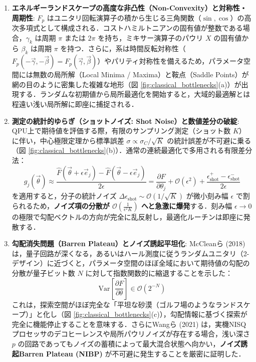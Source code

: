 \documentclass[11pt,a4paper,oneside,openany]{ltjsbook}
\theoremstyle{definition}
\theoremstyle{plain}
\theoremstyle{remark}
\begin{document}
\begin{enumerate}
    \item \textbf{エネルギーランドスケープの高度な非凸性（Non-Convexity）と対称性・周期性}:
          $F_p$ はユニタリ回転演算子の積から生じる三角関数（$\sin, \cos$）の高次多項式として構成される．コストハミルトニアンの固有値が整数である場合，$\gamma_k$ は周期 $\pi$ または $2\pi$ を持ち，ミキサー演算子のパウリ $X$ の固有値から $\beta_k$ は周期 $\pi$ を持つ．さらに，系は時間反転対称性（$F_p(-\vec{\gamma}, -\vec{\beta}) = F_p(\vec{\gamma}, \vec{\beta})$）やパリティ対称性を備えるため，パラメータ空間には無数の局所解（Local Minima / Maxima）と鞍点（Saddle Points）が網の目のように密集した複雑な地形（図 \ref{fig:classical_bottlenecks}(a)）が出現する．ランダムな初期値から局所最適化を開始すると，大域的最適解とは程遠い浅い局所解に即座に捕捉される．
          
    \item \textbf{測定の統計的ゆらぎ（ショットノイズ: Shot Noise）と数値差分の破綻}:
          QPU上で期待値を評価する際，有限のサンプリング測定（ショット数 $K$）に伴い，中心極限定理から標準誤差 $\sigma \propto \sigma_C / \sqrt{K}$ の統計誤差が不可避に乗る（図 \ref{fig:classical_bottlenecks}(b)）．通常の連続最適化で多用される有限差分法：
          \begin{equation}
              g_j(\vec{\theta}) \approx \frac{\hat{F}(\vec{\theta} + \epsilon \vec{e}_j) - \hat{F}(\vec{\theta} - \epsilon \vec{e}_j)}{2\epsilon} = \frac{\partial F}{\partial \theta_j} + \mathcal{O}(\epsilon^2) + \frac{\epsilon_{\text{shot}}^+ - \epsilon_{\text{shot}}^-}{2\epsilon}
          \end{equation}
          を適用すると，分子の統計ノイズ $\Delta \epsilon_{\text{shot}} \sim \mathcal{O}(1/\sqrt{K})$ が微小刻み幅 $\epsilon$ で割られるため，\textbf{ノイズ項の分散が $\mathcal{O}\left(\frac{1}{\epsilon^2 K}\right)$ へと急激に爆発}する．刻み幅 $\epsilon \to 0$ の極限で勾配ベクトルの方向が完全に乱反射し，最適化ルーチンは即座に発散する．
          
    \item \textbf{勾配消失問題（Barren Plateau）とノイズ誘起平坦化}:
          McCleanら (2018)\cite{mcclean2018barren} は，量子回路が深くなる，あるいはハール測度に従うランダムユニタリ（2-デザイン）に近づくと，パラメータ空間のほぼ全域において期待値の勾配の分散が量子ビット数 $N$ に対して指数関数的に縮退することを示した：
          \begin{equation}
              \text{Var}\left[ \frac{\partial F}{\partial \theta} \right] \in \mathcal{O}(2^{-N})
          \end{equation}
          これは，探索空間がほぼ完全な「平坦な砂漠（ゴルフ場のようなランドスケープ）」と化し（図 \ref{fig:classical_bottlenecks}(c)），勾配情報に基づく探索が完全に機能停止することを意味する．さらにWangら (2021)\cite{wang2021noise} は，実機NISQプロセッサのデコヒーレンスや局所パウリノイズが存在する場合，浅い深さ $p$ の回路であってもノイズの蓄積によって最大混合状態へ向かい，\textbf{ノイズ誘起Barren Plateau (NIBP)} が不可避に発生することを厳密に証明した．
\end{enumerate}
\end{document}
